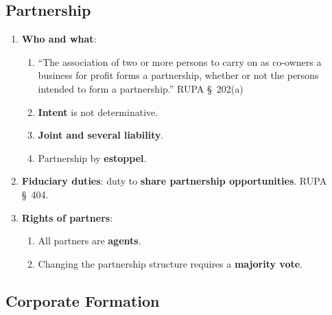 \newpage

\subsection{Partnership}

\begin{enumerate}
    \item \textbf{Who and what}:
    \begin{enumerate}
        \item ``The association of two or more persons to carry on as 
        co-owners a business for profit forms a partnership, whether or not 
        the persons intended to form a partnership.'' RUPA \S\ 202(a)
        \item \textbf{Intent} is not determinative.
        \item \textbf{Joint and several liability}.
        \item Partnership by \textbf{estoppel}.
    \end{enumerate}
    \item \textbf{Fiduciary duties}: duty to \textbf{share partnership 
    opportunities}. RUPA \S\ 404.
    \item \textbf{Rights of partners}:
    \begin{enumerate}
        \item All partners are \textbf{agents}.
        \item Changing the partnership structure requires a \textbf{majority 
        vote}.
    \end{enumerate}
\end{enumerate}

\newpage

\subsection{Corporate Formation}

